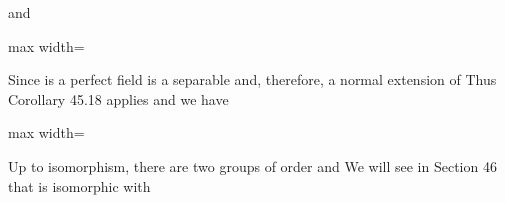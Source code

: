 \documentclass[11pt,oneside]{article}
\begin{document}
\begin{BookBody}
\noindent and

\begin{center}\begin{adjustbox}{max width=\linewidth}\end{adjustbox}\end{center}

\noindent Since  is a perfect field is a separable and, therefore, a normal extension of  Thus Corollary 45.18 applies and we have

\begin{center}\begin{adjustbox}{max width=\linewidth}\end{adjustbox}\end{center}

\noindent Up to isomorphism, there are two groups of order  and  We will see in Section 46 that  is isomorphic with \BookEnd{\blacktriangle}

\end{BookBody}

\BookNarrativefalse
\end{document}
